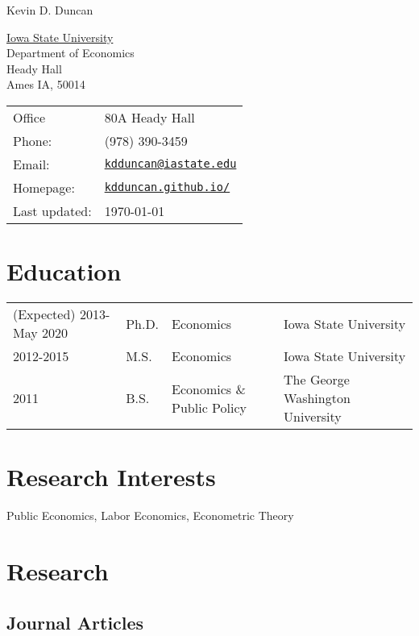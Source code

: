\documentclass[letterpaper]{article}
\def\name{Kevin D. Duncan}
\begin{document}
{\huge \name}


\vspace{0.25in}

\begin{minipage}{0.45\linewidth}
  \href{http://www.unc.edu/}{Iowa State University} \\
  Department of Economics \\
  Heady Hall \\
  Ames IA, 50014
\end{minipage}
\begin{minipage}{0.45\linewidth}
  \begin{tabular}{ll}
    Office & 80A Heady Hall \\
    Phone: & (978) 390-3459 \\
    Email: & \href{mailto:kdduncan@iastate.edu}{\tt kdduncan@iastate.edu} \\
    Homepage: & \href{kdduncan.github.io/}{\tt kdduncan.github.io/} \\
    Last updated: & \today \\
  \end{tabular}
\end{minipage}


\section*{Education}

\begin{tabular}{@{}llll}
  (Expected) 2013-May 2020  & Ph.D. &Economics &Iowa State University \\
    2012-2015 &M.S. &Economics &Iowa State University \\
  2011 & B.S. &Economics \& Public Policy &The George Washington University
\end{tabular}

\section*{Research Interests}

Public Economics, Labor Economics, Econometric Theory

\section*{Research}

\subsection*{Journal Articles}
\end{document}
